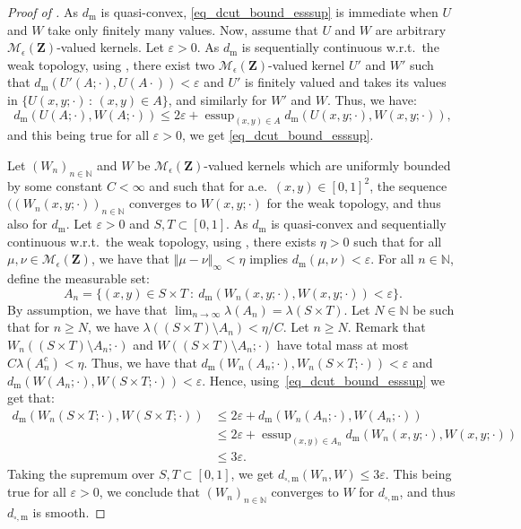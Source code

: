 \documentclass{amsart}
\newcommand{\wrt}{w.r.t.\ }
\newcommand{\aE}{a.e.\ }
\theoremstyle{plain}
\theoremstyle{definition}
\newcommand{\Space}{\mathbf{Z}}
\newcommand{\MeasEps}{\mathcal{M}_{\epsilon}(\Space)}
\newcommand{\TM}[1]{\norm{#1}_\infty}
\newcommand{\m}{\mathrm{m}}
\newcommand{\dmeas}{d_\m}
\newcommand{\dcut}{d_{\square,\m}}
\newcommand{\N}{\mathbb{N}}
\newcommand{\norm}[1]{\Vert#1\Vert}
\DeclareMathOperator*{\esssup}{\mathrm{essup}}
\newcommand{\eps}{\varepsilon}
\begin{document}
\begin{proof}[Proof of ]
As $\dmeas$ is quasi-convex, \eqref{eq_dcut_bound_esssup} is immediate 
when $U$ and $W$ take only finitely many values.
Now, assume that $U$ and $W$ are arbitrary $\MeasEps$-valued kernels.
Let $\eps>0$. As $\dmeas$ is sequentially continuous \wrt the weak topology, 
using ,
	there exist two $\MeasEps$-valued kernel $U'$ and $W'$
	such that $\dmeas(U'(A;\cdot), U(A\cdot)) < \eps$ and
		$U'$ is finitely valued and takes its values in
	$\{ U(x,y;\cdot) \, : \, (x,y)\in A \}$,
	and similarly for $W'$ and $W$.
Thus, we have:
\begin{equation*}
\dmeas(U(A;\cdot),W(A;\cdot)) \leq 2\eps + \esssup_{(x,y)\in A} \dmeas(U(x,y;\cdot), W(x,y;\cdot)),
\end{equation*}
and this being true for all $\eps>0$, we get \eqref{eq_dcut_bound_esssup}.
\medskip


Let $(W_n)_{n\in\N}$ and $W$ be $\MeasEps$-valued kernels
	which are uniformly bounded by some constant $C<\infty$
	and such that for \aE $(x,y)\in[0,1]^2$, the sequence 
	$((W_n(x,y;\cdot))_{n\in\N}$ converges to $W(x,y;\cdot)$
	for the weak topology, and thus also for $\dmeas$.
Let $\eps>0$ and $S,T\subset [0,1]$.
As $\dmeas$ is quasi-convex and sequentially continuous \wrt the weak topology,
using  ,
there exists  $\eta>0$  such that for all $\mu,\nu\in\MeasEps$, we have that
	$\TM{\mu-\nu} < \eta$ implies $\dmeas(\mu,\nu)<\eps$.
For all $n\in\N$, define the measurable set:
	\[ A_n = \{ (x,y)\in S\times T \ : \ \dmeas(W_n(x,y;\cdot), W(x,y;\cdot)) < \eps \} . \]
By assumption, we have that $\lim_{n\to\infty} \lambda(A_n) = \lambda(S\times T)$.
Let $N\in\N$ be such that for $n\geq N$, we have $\lambda((S\times T) \setminus A_n) < \eta/C$.
Let $n\geq N$. 
Remark that $W_n((S\times T) \setminus A_n; \cdot)$ and $W((S\times T) \setminus A_n;\cdot)$
	have total mass at most $C \lambda(A_n^c) < \eta$. 
Thus, we have that $\dmeas(W_n(A_n;\cdot), W_n(S\times T;\cdot))<\eps$
	and $\dmeas(W(A_n;\cdot), W(S\times T;\cdot))<\eps$.
Hence, using~\eqref{eq_dcut_bound_esssup} we get that:
\begin{align*}
\dmeas(W_n(S\times T;\cdot), W(S\times T;\cdot)) 
& \leq 2\eps + \dmeas(W_n(A_n;\cdot), W(A_n;\cdot)) \\
& \leq 2\eps + \esssup_{(x,y)\in A_n} \dmeas(W_n(x,y;\cdot), W(x,y;\cdot)) \\
& \leq 3\eps .
\end{align*}
Taking the supremum over $S,T\subset [0,1]$, we get $\dcut(W_n,W) \leq 3\eps$.
This being true for all $\eps>0$, we conclude that $(W_n)_{n\in\N}$ converges to $W$ for $\dcut$,
and thus $\dcut$ is smooth.
\end{proof}
\end{document}
